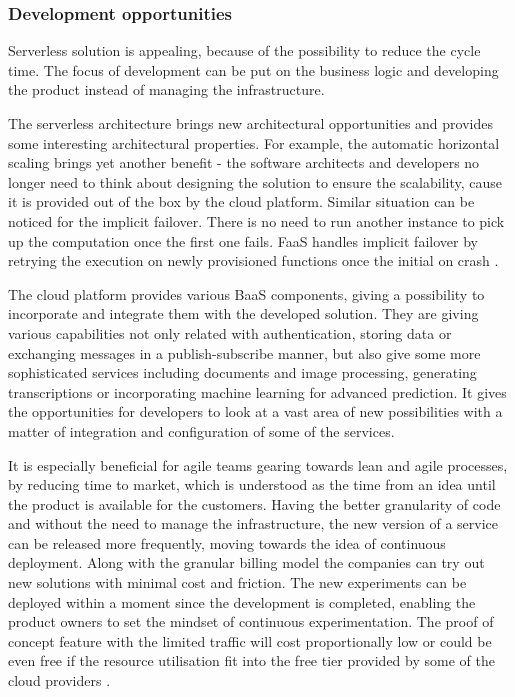 \subsubsection*{Development opportunities}

Serverless solution is appealing, because of the possibility to reduce the cycle time. The focus of development can be put on the business logic and developing the product instead of managing the infrastructure.

The serverless architecture brings new architectural opportunities and provides some interesting architectural properties. For example, the automatic horizontal scaling brings yet another benefit - the software architects and developers no longer need to think about designing the solution to ensure the scalability, cause it is provided out of the box by the cloud platform. Similar situation can be noticed for the implicit failover. There is no need to run another instance to pick up the computation once the first one fails. FaaS handles implicit failover by retrying the execution on newly provisioned functions once the initial on crash \cite{LeveragingServerlessCloudComputingArchitectures}.

The cloud platform provides various BaaS components, giving a possibility to incorporate and integrate them with the developed solution. They are giving various capabilities not only related with authentication, storing data or exchanging messages in a publish-subscribe manner, but also give some more sophisticated services including documents and image processing, generating transcriptions or incorporating machine learning for advanced prediction. It gives the opportunities for developers to look at a vast area of new possibilities with a matter of integration and configuration of some of the services.

It is especially beneficial for agile teams gearing towards lean and agile processes, by reducing time to market, which is understood as the time from an idea until the product is available for the customers. Having the better granularity of code and without the need to manage the infrastructure, the new version of a service can be released more frequently, moving towards the idea of continuous deployment. Along with the granular billing model the companies can try out new solutions with minimal cost and friction. The new experiments can be deployed within a moment since the development is completed, enabling the product owners to set the mindset of continuous experimentation. The proof of concept feature with the limited traffic will cost proportionally low or could be even free if the resource utilisation fit into the free tier provided by some of the cloud providers \cite{MartinFowlerServerless}.

